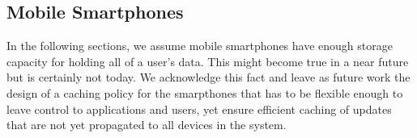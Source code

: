 \subsection {Mobile Smartphones}

In the following sections, we assume mobile smartphones have enough
storage capacity for holding all of a user's data. This might become
true in a near future but is certainly not today. We acknowledge this
fact and leave as future work the design of a caching policy for the
smarpthones that has to be flexible enough to leave control to
applications and users, yet ensure efficient caching of updates that
are not yet propagated to all devices in the system.

